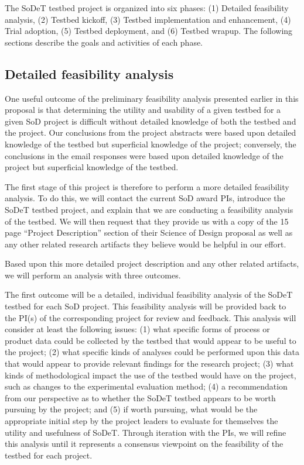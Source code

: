 The SoDeT testbed project is organized into six phases: 
(1) Detailed feasibility analysis, (2) Testbed kickoff, (3) Testbed
implementation and enhancement, (4) Trial adoption, (5) Testbed
deployment, and (6) Testbed wrapup.  The following sections describe
the goals and activities of each phase.  

\subsection{Detailed feasibility analysis}
\label{sec:detailed-study}

One useful outcome of the preliminary feasibility analysis presented 
earlier in this proposal is that determining the utility and usability
of a given testbed for a given SoD project is difficult without detailed
knowledge of both the testbed and the project.  Our conclusions from the
project abstracts were based upon detailed knowledge of the testbed but
superficial knowledge of the project; conversely, the conclusions in the
email responses were based upon detailed knowledge of the project but
superficial knowledge of the testbed. 

The first stage of this project is therefore to perform a more
detailed feasibility analysis.  To do this, we will contact the
current SoD award PIs, introduce the SoDeT testbed project, and explain
that we are conducting a feasibility analysis of the testbed. We
will then request that they provide us with a copy of the 15 page ``Project
Description'' section of their Science of Design proposal as well as any
other related research artifacts they believe would be helpful in our 
effort.

Based upon this more detailed project description and any other related
artifacts, we will perform an analysis with three outcomes.

The first outcome will be a detailed, individual feasibility analysis of
the SoDeT testbed for each SoD project.  This feasibility analysis will be
provided back to the PI(s) of the corresponding project for review and
feedback.  This analysis will consider at least the following issues: (1)
what specific forms of process or product data could be collected by the
testbed that would appear to be useful to the project; (2) what specific
kinds of analyses could be performed upon this data that would appear to
provide relevant findings for the research project; (3) what kinds of
methodological impact the use of the testbed would have on the project,
such as changes to the experimental evaluation method; (4) a recommendation
from our perspective as to whether the SoDeT testbed appears to be worth
pursuing by the project; and (5) if worth pursuing, what would be the
appropriate initial step by the project leaders to evaluate for themselves
the utility and usefulness of SoDeT.  Through iteration with the PIs, we
will refine this analysis until it represents a consensus viewpoint on the 
feasibility of the testbed for each project. 

